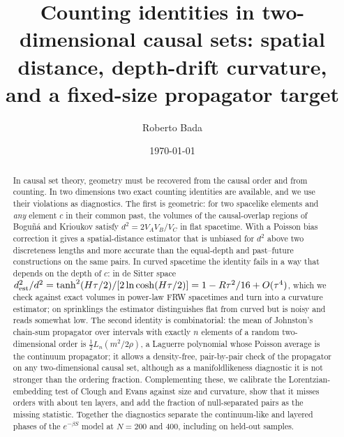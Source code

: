 \documentclass[prd,twocolumn,superscriptaddress,nofootinbib,amsmath,amssymb,floatfix]{revtex4-2}
\begin{document}
\title{Counting identities in two-dimensional causal sets: spatial distance, depth-drift curvature, and a fixed-size propagator target}

\author{Roberto Bada}

\date{\today}

\begin{abstract}
In causal set theory, geometry must be recovered from the causal order and from counting. In two dimensions two exact counting identities are available, and we use their violations as diagnostics. The first is geometric: for two spacelike elements and \emph{any} element $c$ in their common past, the volumes of the causal-overlap regions of Bogu\~n\'a and Krioukov satisfy $d^2=2V_AV_B/V_C$ in flat spacetime. With a Poisson bias correction it gives a spatial-distance estimator that is unbiased for $d^2$ above two discreteness lengths and more accurate than the equal-depth and past--future constructions on the same pairs. In curved spacetime the identity fails in a way that depends on the depth of $c$: in de Sitter space $d^2_{\rm est}/d^2=\tanh^2(H\tau/2)/[2\ln\cosh(H\tau/2)]=1-R\tau^2/16+O(\tau^4)$, which we check against exact volumes in power-law FRW spacetimes and turn into a curvature estimator; on sprinklings the estimator distinguishes flat from curved but is noisy and reads somewhat low. The second identity is combinatorial: the mean of Johnston's chain-sum propagator over intervals with exactly $n$ elements of a random two-dimensional order is $\tfrac12L_n(m^2/2\rho)$, a Laguerre polynomial whose Poisson average is the continuum propagator; it allows a density-free, pair-by-pair check of the propagator on any two-dimensional causal set, although as a manifoldlikeness diagnostic it is not stronger than the ordering fraction. Complementing these, we calibrate the Lorentzian-embedding test of Clough and Evans against size and curvature, show that it misses orders with about ten layers, and add the fraction of null-separated pairs as the missing statistic. Together the diagnostics separate the continuum-like and layered phases of the $e^{-\beta S}$ model at $N=200$ and $400$, including on held-out samples.
\end{abstract}

\maketitle
\end{document}
